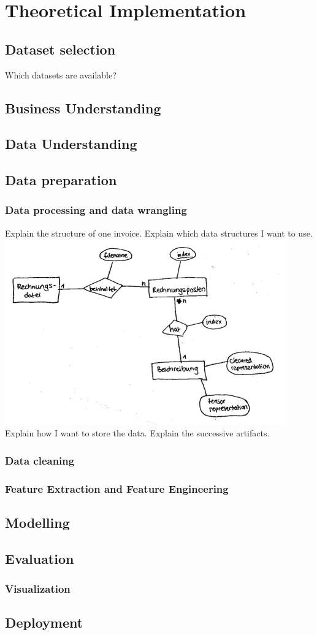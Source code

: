 \chapter{Theoretical Implementation}

\section{Dataset selection}
Which datasets are available?


\section{Business Understanding}

\section{Data Understanding}



\section{Data preparation}

\subsection{Data processing and data wrangling}
Explain the structure of one invoice.
Explain which data structures I want to use.
\includegraphics[height=8cm]{Bilder/data_model.png}
Explain how I want to store the data. Explain the successive artifacts.

\subsection{Data cleaning}


\subsection{Feature Extraction and Feature Engineering}

\section{Modelling}
\section{Evaluation}
\subsection{Visualization}
\section{Deployment}